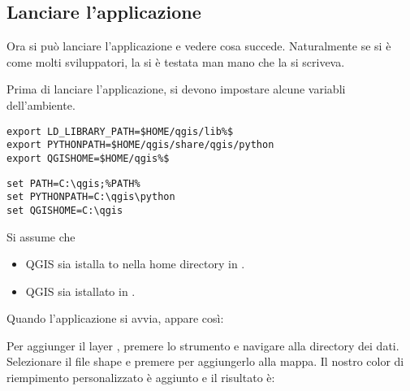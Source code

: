 \subsection{Lanciare l'applicazione}

Ora si può lanciare l'applicazione e vedere cosa succede. Naturalmente se si è come molti sviluppatori, la si è testata man mano che la si scriveva. 

Prima di lanciare l'applicazione, si devono impostare alcune variabli dell'ambiente. 

\nix{}\osx{}
\begin{verbatim}
export LD_LIBRARY_PATH=$HOME/qgis/lib%$
export PYTHONPATH=$HOME/qgis/share/qgis/python
export QGISHOME=$HOME/qgis%$
\end{verbatim}

\win{}
\begin{verbatim}
set PATH=C:\qgis;%PATH%
set PYTHONPATH=C:\qgis\python
set QGISHOME=C:\qgis
\end{verbatim}

Si assume che
\begin{itemize}
\item\nix{}\osx{}QGIS sia istalla to nella home directory in 
. 
\item\win{}QGIS sia istallato in .
\end{itemize}

Quando l'applicazione si avvia, appare così:


Per aggiunger il layer , premere lo strumento 
 e navigare alla directory dei dati.
Selezionare il file shape e premere  per aggiungerlo alla mappa. 
Il nostro color di riempimento personalizzato è aggiunto e il risultato è:


